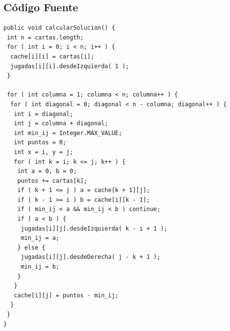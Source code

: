 \subsection{C\'odigo Fuente}
\begin{verbatim}
public void calcularSolucion() {
 int n = cartas.length;
 for ( int i = 0; i < n; i++ ) {
  cache[i][i] = cartas[i];
  jugadas[i][i].desdeIzquierda( 1 );
 }

 for ( int columna = 1; columna < n; columna++ ) {
  for ( int diagonal = 0; diagonal < n - columna; diagonal++ ) {
   int i = diagonal;
   int j = columna + diagonal;
   int min_ij = Integer.MAX_VALUE;
   int puntos = 0;
   int x = i, y = j;
   for ( int k = i; k <= j; k++ ) {
    int a = 0, b = 0;
    puntos += cartas[k];
    if ( k + 1 <= j ) a = cache[k + 1][j];
    if ( k - 1 >= i ) b = cache[i][k - 1];
    if ( min_ij < a && min_ij < b ) continue;
    if ( a < b ) {
     jugadas[i][j].desdeIzquierda( k - i + 1 );
     min_ij = a;
    } else {
     jugadas[i][j].desdeDerecha( j - k + 1 );
     min_ij = b;
    }
   }
   cache[i][j] = puntos - min_ij;
  }
 }
}
\end{verbatim}
